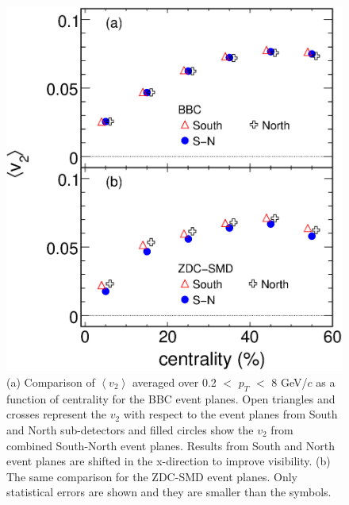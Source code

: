 \documentclass[aps,prc,superscriptaddress,showpacs,floatfix,twocolumn]{revtex4}
\newcommand \pt{\mbox{$p_T$}\xspace}
\begin{document}
\begin{figure}[b]
\includegraphics[width=1.0\linewidth]{comparison_v2cent_bbc_and_zdc-smd_differentep.eps}
\caption{\label{fig:comparison_v2cent_bbc_and_zdc-smd_differentep} 
(a) Comparison of $\left<v_2\right>$ averaged over 0.2 $<$ \pt 
$<$ 8 GeV/$c$ as a function of centrality for the BBC event 
planes. Open triangles and crosses represent the $v_2$ with 
respect to the event planes from South and North sub-detectors 
and filled circles show the $v_2$ from combined South-North 
event planes. Results from South and North event planes are 
shifted in the x-direction to improve visibility. 
(b) The same comparison for the ZDC-SMD event planes. Only 
statistical errors are shown and they are smaller than the 
symbols.
}
\end{figure}
 
\end{document}

